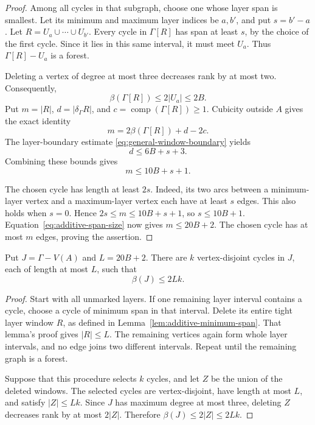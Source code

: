 \begin{proof}
Among all cycles in that subgraph, choose one whose layer span is smallest.
Let its minimum and maximum layer indices be $a,b'$, and put $s=b'-a$.
Let $R=U_a\cup\cdots\cup U_{b'}$.
Every cycle in $\Gamma[R]$ has span at least $s$, by the choice of the first cycle.
Since it lies in this same interval, it must meet $U_a$.
Thus $\Gamma[R]-U_a$ is a forest.

Deleting a vertex of degree at most three decreases rank by at most two.
Consequently,
\[
 \beta(\Gamma[R])\le2|U_a|\le2B.
\]
Put $m=|R|$, $d=|\delta_\Gamma R|$, and $c=\operatorname{comp}(\Gamma[R])\ge1$.
Cubicity outside $A$ gives the exact identity
\[
 m=2\beta(\Gamma[R])+d-2c.
\]
The layer-boundary estimate \eqref{eq:general-window-boundary} yields
\[
 d\le6B+s+3.
\]
Combining these bounds gives
\begin{equation}\label{eq:additive-span-size}
 m\le10B+s+1.
\end{equation}

The chosen cycle has length at least $2s$.
Indeed, its two arcs between a minimum-layer vertex and a maximum-layer vertex each have at least $s$ edges.
This also holds when $s=0$.
Hence $2s\le m\le10B+s+1$, so $s\le10B+1$.
Equation~\eqref{eq:additive-span-size} now gives $m\le20B+2$.
The chosen cycle has at most $m$ edges, proving the assertion.
\end{proof}

\begin{lemma}\label{lem:additive-layer-deletion}
Put $J=\Gamma-V(A)$ and $L=20B+2$.
There are $k$ vertex-disjoint cycles in $J$, each of length at most $L$, such that
\[
 \beta(J)\le2Lk.
\]
\end{lemma}

\begin{proof}
Start with all unmarked layers.
If one remaining layer interval contains a cycle, choose a cycle of minimum span in that interval.
Delete its entire tight layer window $R$, as defined in Lemma~\ref{lem:additive-minimum-span}.
That lemma's proof gives $|R|\le L$.
The remaining vertices again form whole layer intervals, and no edge joins two different intervals.
Repeat until the remaining graph is a forest.

Suppose that this procedure selects $k$ cycles, and let $Z$ be the union of the deleted windows.
The selected cycles are vertex-disjoint, have length at most $L$, and satisfy $|Z|\le Lk$.
Since $J$ has maximum degree at most three, deleting $Z$ decreases rank by at most $2|Z|$.
Therefore $\beta(J)\le2|Z|\le2Lk$.
\end{proof}

